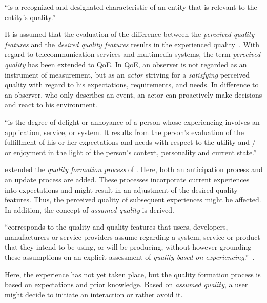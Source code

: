 \begin{definition}
``is a recognized and designated characteristic of an entity that is relevant to the entity's quality.''~\citep[][p.\,17]{jekosch_voice_2005}
\end{definition}

It is assumed that the evaluation of the difference between the \emph{perceived quality features} and the \emph{desired quality features} results in the experienced quality~\citep[p.\,23]{raake_quality_2014}.
With regard to telecommunication services and multimedia systems, the term \emph{perceived quality} has been extended to \acf{QoE}.
In \ac{QoE}, an observer is not regarded as an instrument of measurement, but as an \emph{actor} striving for a \emph{satisfying} perceived quality with regard to his expectations, requirements, and needs.
In difference to an observer, who only describes an event, an actor can proactively make decisions and react to his environment.  

\begin{definition}
``is the degree of delight or annoyance of a person whose experiencing involves an application, service, or system.
It results from the person’s evaluation of the fulfillment of his or her expectations and needs with respect to the utility and / or enjoyment in the light of the person’s context, personality and current state.''~\citep[][p.\,19]{raake_quality_2014}
\end{definition}

\citet{raake_quality_2014} extended the \emph{quality formation process} of \citet{jekosch_voice_2005}.
Here, both an anticipation process and an update process are added.
These processes incorporate current experiences into expectations and might result in an adjustment of the desired quality features.
Thus, the perceived quality of subsequent experiences might be affected.
In addition, the concept of \emph{assumed quality} is derived.
\begin{definition}\label{def:assumedquality}
``corresponds to the quality and quality features that users, developers, manufacturers or service providers assume regarding a system, service or product that they intend to be using, or will be producing, without however grounding these assumptions on an explicit assessment of \textit{quality based on experiencing}.''~\citep[][p.\,17]{raake_quality_2014}.
\end{definition}
Here, the experience has not yet taken place, but the quality formation process is based on expectations and prior knowledge.
Based on \emph{assumed quality}, a user might decide to initiate an interaction or rather avoid it.

